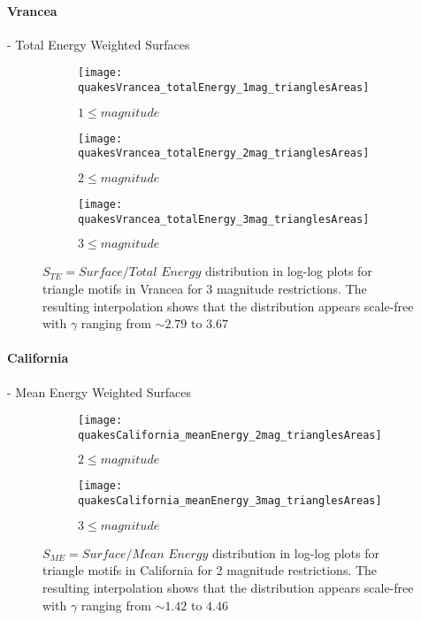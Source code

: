 \paragraph{Vrancea} - Total Energy Weighted Surfaces
\begin{figure}[h!]

\begin{subfigure}{.99\textwidth}
  \centering
  \texttt{[image: quakesVrancea\_totalEnergy\_1mag\_trianglesAreas]}
  \caption{$1 \leq magnitude$}
  \label{fig:trianglesVrTE1}
\end{subfigure}%

\begin{subfigure}{.99\textwidth}
  \centering
  \texttt{[image: quakesVrancea\_totalEnergy\_2mag\_trianglesAreas]}
  \caption{$2 \leq magnitude$}
  \label{fig:trianglesVrTE2}
\end{subfigure}%

\begin{subfigure}{.99\textwidth}
  \centering
  \texttt{[image: quakesVrancea\_totalEnergy\_3mag\_trianglesAreas]}
  \caption{$3 \leq magnitude$}
  \label{fig:trianglesVrTe3}
\end{subfigure}%

\caption{$S_{TE} = Surface/Total$ $Energy$ distribution in log-log plots for triangle motifs in Vrancea for 3 magnitude restrictions. The resulting interpolation shows that the distribution appears scale-free with $\gamma$ ranging from $\sim 2.79$ to $3.67$ }
\label{fig:trianglesSurfacesVrTE}
\end{figure}


\clearpage
\paragraph{California} - Mean Energy Weighted Surfaces
\begin{figure}[h!]

\begin{subfigure}{.99\textwidth}
  \centering
  \texttt{[image: quakesCalifornia\_meanEnergy\_2mag\_trianglesAreas]}
  \caption{$2 \leq magnitude$}
  \label{fig:trianglesCaME2}
\end{subfigure}%

\begin{subfigure}{.99\textwidth}
  \centering
  \texttt{[image: quakesCalifornia\_meanEnergy\_3mag\_trianglesAreas]}
  \caption{$3 \leq magnitude$}
  \label{fig:trianglesCaME3}
\end{subfigure}%

\caption{$S_{ME} = Surface/Mean$ $Energy$ distribution in log-log plots for triangle motifs in California for 2 magnitude restrictions. The resulting interpolation shows that the distribution appears scale-free with $\gamma$ ranging from $\sim 1.42$ to $4.46$}
\label{fig:trianglesSurfacesCaME}
\end{figure}


